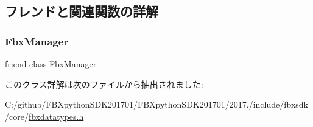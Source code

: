\subsection{フレンドと関連関数の詳解}
\mbox{\label{class_fbx_data_type_aa6292f0d09535e3fe957088d09276268}} 
\subsubsection{\texorpdfstring{Fbx\+Manager}{FbxManager}}
{\footnotesize\ttfamily friend class \hyperlink{class_fbx_manager}{Fbx\+Manager}\hspace{0.3cm}{\ttfamily [friend]}}



このクラス詳解は次のファイルから抽出されました\+:\begin{DoxyCompactItemize}
\item 
C\+:/github/\+F\+B\+Xpython\+S\+D\+K201701/\+F\+B\+Xpython\+S\+D\+K201701/2017./include/fbxsdk/core/\hyperlink{fbxdatatypes_8h}{fbxdatatypes.\+h}\end{DoxyCompactItemize}
